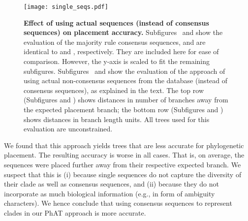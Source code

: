 \begin{figure}[hpbt]
    \centering
    \texttt{[image: single\_seqs.pdf]}
    \begin{subfigure}{0pt}
        \label{fig:single_seqs:sub:majorities_edge}
    \end{subfigure}
    \begin{subfigure}{0pt}
        \label{fig:single_seqs:sub:single_seq_edge}
    \end{subfigure}
    \begin{subfigure}{0pt}
        \label{fig:single_seqs:sub:majorities_branch}
    \end{subfigure}
    \begin{subfigure}{0pt}
        \label{fig:single_seqs:sub:single_seq_branch}
    \end{subfigure}
    \caption[Effect of using actual sequences on placement accuracy]{
        \textbf{Effect of using actual sequences (instead of consensus sequences) on placement accuracy.}
        Subfigures~
        and 
        show the evaluation of the majority rule consensus sequences, and are identical to
         and ,
        respectively.
        They are included here for ease of comparison. 
        However, the y-axis is scaled to fit the remaining subfigures.
        Subfigures~ and 
        show the evaluation of the approach of using actual non-consensus sequences 
        from the database (instead of consensus sequences), as explained in the text.
        The top row (Subfigures  and )
        shows distances in number of branches away from the expected placement branch;
        the bottom row (Subfigures  and )
        shows distances in branch length units.
        All trees used for this evaluation are unconstrained.
    }
    \label{fig:single_seqs}
\end{figure}

We found that this approach yields trees that are less accurate for phylogenetic placement.
The resulting accuracy is worse in all cases.
That is, on average, the sequences were placed further away from their respective expected branch.
We suspect that this is (i) because single sequences do not capture the diversity of their clade
as well as consensus sequences,
and (ii) because they do not incorporate as much biological information (e.g., in form of ambiguity characters).
We hence conclude that using consensus sequences to represent clades in our \ac{PhAT} approach is more accurate.

